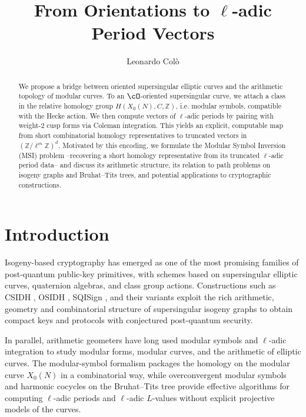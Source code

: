 \documentclass[10pt]{amsart}
\title{From Orientations to $\ell$-adic Period Vectors}
\author{Leonardo Col\`o}
\date{}
\theoremstyle{theostyle}
\newcommand{\ZZ}{\mathbb{Z}}
\begin{document}
	
	\begin{abstract}
We propose a bridge between oriented supersingular elliptic curves and the arithmetic topology of modular curves.  To an $\cO$-oriented supersingular curve, we attach a class in the relative homology group $H\left(X_0(N),C,\ZZ\right)$, i.e. modular symbols, compatible with the Hecke action. We then compute vectors of $\ell$-adic periods by pairing with weight-$2$ cusp forms via Coleman integration. This yields an explicit, computable map from short combinatorial homology representatives to truncated vectors in $(\ZZ/\ell^m\ZZ)^d$. Motivated by this encoding, we formulate the Modular Symbol Inversion (MSI) problem --recovering a short homology representative from its truncated $\ell$-adic period data-- and discuss its arithmetic structure, its relation to path problems on isogeny graphs and Bruhat–Tits trees, and potential applications to cryptographic constructions.
	\end{abstract}
	
\maketitle

\section{Introduction}

Isogeny-based cryptography has emerged as one of the most promising families
of post-quantum public-key primitives, with schemes based on supersingular
elliptic curves, quaternion algebras, and class group actions.
Constructions such as CSIDH \cite{CSIDH}, OSIDH \cite{OSIDH}, SQISign \cite{SQISign}, and their variants exploit the
rich arithmetic, geometry and combinatorial structure of supersingular isogeny graphs to obtain compact keys and protocols with conjectured post-quantum
security.

In parallel, arithmetic geometers have long used modular symbols
and $\ell$-adic integration to study modular forms, modular curves, and the
arithmetic of elliptic curves. The modular-symbol formalism packages the homology
on the modular curve $X_0(N)$ in a combinatorial way, while overconvergent
modular symbols and harmonic cocycles on the Bruhat--Tits tree provide
effective algorithms for computing $\ell$-adic periods and $\ell$-adic $L$-values
without explicit projective models of the curves.
\end{document}
